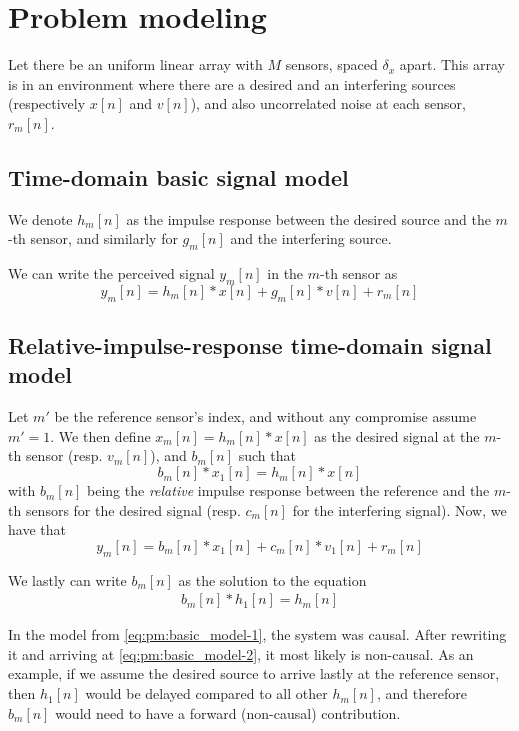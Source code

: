 \section{Problem modeling}

Let there be an uniform linear array with $M$ sensors, spaced $\delta_x$ apart. This array is in an environment where there are a desired and an interfering sources (respectively $x[n]$ and $v[n]$), and also uncorrelated noise at each sensor, $r_m[n]$.

\subsection{Time-domain basic signal model}
We denote $h_m[n]$ as the impulse response between the desired source and the $m$-th sensor, and similarly for $g_m[n]$ and the interfering source.

We can write the perceived signal $y_m[n]$ in the $m$-th sensor as
\begin{equation}\label{eq:pm:basic_model-1}
	y_m[n] = h_m[n] \ast x[n] + g_m[n] \ast v[n] + r_m[n]
\end{equation}

\subsection{Relative-impulse-response time-domain signal model}
Let $m'$ be the reference sensor's index, and without any compromise assume $m' = 1$. We then define $x_m[n] = h_m[n] \ast x[n]$ as the desired signal at the $m$-th sensor (resp. $v_m[n]$), and $b_m[n]$ such that
\begin{equation}
	b_m[n] \ast x_1[n] = h_m[n] \ast x[n]
\end{equation}
with $b_m[n]$ being the \emph{relative} impulse response between the reference and the $m$-th sensors for the desired signal (resp. $c_m[n]$ for the interfering signal). Now, we have that
\begin{equation}\label{eq:pm:basic_model-2}
	y_m[n] = b_m[n] \ast x_1[n] + c_m[n] \ast v_1[n] + r_m[n]
\end{equation}

We lastly can write $b_m[n]$ as the solution to the equation
\begin{eqnarray}
	b_m[n] \ast h_1[n] = h_m[n]
\end{eqnarray}

In the model from \cref{eq:pm:basic_model-1}, the system was causal. After rewriting it and arriving at \cref{eq:pm:basic_model-2}, it most likely is non-causal. As an example, if we assume the desired source to arrive lastly at the reference sensor, then $h_1[n]$ would be delayed compared to all other $h_m[n]$, and therefore $b_m[n]$ would need to have a forward (non-causal) contribution.


